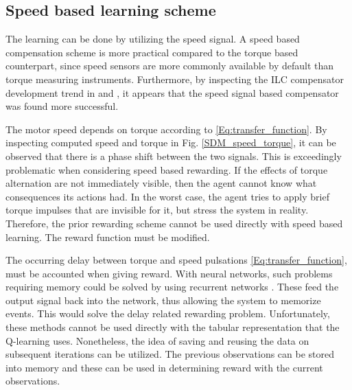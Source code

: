 
\subsection{Speed based learning scheme}

The learning can be done by utilizing the speed signal. A speed based compensation scheme is more practical compared to the torque based counterpart, since speed sensors are more commonly available by default than torque measuring instruments. Furthermore, by inspecting the ILC compensator development trend in \cite{ILC:2004} and \cite{ILC:2005}, it appears that the speed signal based compensator was found more successful.

The motor speed depends on torque according to \eqref{Eq:transfer_function}. By inspecting computed speed and torque in Fig. \ref{SDM_speed_torque}, it can be observed that there is a phase shift between the two signals. This is exceedingly problematic when considering speed based rewarding. If the effects of torque alternation are not immediately visible, then the agent cannot know what consequences its actions had. In the worst case, the agent tries to apply brief torque impulses that are invisible for it, but stress the system in reality. Therefore, the prior rewarding scheme cannot be used directly with speed based learning. The reward function must be modified.

The occurring delay between torque and speed pulsations \eqref{Eq:transfer_function}, must be accounted when giving reward. With neural networks, such problems requiring memory could be solved by using recurrent networks \cite{RL:memory}. These feed the output signal back into the network, thus allowing the system to memorize events. This would solve the delay related rewarding problem. Unfortunately, these methods cannot be used directly with the tabular representation that the Q-learning uses. Nonetheless, the idea of saving and reusing the data on subsequent iterations can be utilized. The previous observations can be stored into memory and these can be used in determining reward with the current observations. 

